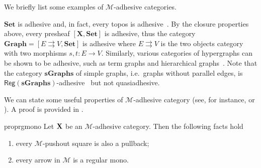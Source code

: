 \documentclass[3p]{elsarticle}
\newcommand{\cat}[1]{\ensuremath{\mathbf{#1}}}
\def\C{\textbf {\textup{C}}}
\def\X{\textbf {\textup{X}}}
\newcommand{\reg}{\mathsf{Reg}}
\theoremstyle{remark}
\theoremstyle{definition}
\begin{document}
We briefly list some examples of $\mathcal{M}$-adhesive categories.

\begin{exa}
	\label{ex:adhesive}
	$\cat{Set}$ is adhesive and, in fact, every topos is
	adhesive~\cite{lack2006toposes}. By the closure properties above, every presheaf $[\cat{X},\cat{Set}]$ is adhesive, thus the category
	$\cat{Graph} = [ E \rightrightarrows V, \cat{Set}]$ is adhesive
	where $E \rightrightarrows {V}$ is the two objects category with two
	morphisms $s,t \colon{E} \to {V}$. Similarly, various
	categories of hypergraphs can be shown to be adhesive, such as term
	graphs and hierarchical graphs~\cite{CastelnovoGM24}. Note that the category $\cat{sGraphs}$ of simple graphs, 
	i.e.~graphs without parallel edges, is
	$\reg{(\cat{sGraphs})}$-adhesive~\cite{BehrHK23} but not
	quasiadhesive.
\end{exa}

\iffalse 
\begin{rem}\label{rem:deco}
We can point out an important property of strict $\mathcal{M}$-adhesive categories with pullbacks.  Consider the solid part of the cube aside, whose bottom case is an $\mathcal{M}$-pushout.
	
	\parbox{9.5cm}{	Given an arrow $d\colon X\to D$, we can present the object $X$ has a pushout: indeed, consider the following cube, in which all the three vertical squares are pullbacks.}
	\parbox{3cm}{
	\xymatrix@C=15pt@R=9pt{&V\ar[dd]|\hole_(.65){a}\ar[rr]^{v} \ar@{>.>}[dl]_{u} && Y \ar[dd]^{b} \ar@{>->}[dl]_{y} \\ Z  \ar[dd]_{c}\ar[rr]^(.7){z} & & X \ar[dd]_(.3){d}\\&A\ar[rr]|\hole^(.65){f} \ar@{>->}[dl]^{m} && B \ar@{>->}[dl]^{n} \\C \ar[rr]_{g} & & D }}

Now, notice that, since the front square is a pullback, then the dotted arrow $u\colon V\to Z$ exists. Moreover, the usual composition and decomposition property of pullbacks \cite{mac2013categories} entails that the left face of the cube so obtained is a pullback too, proving that $u$ is in $\mathcal{M}$ and that the top square is a pushout.

	Clearly if the arrow $p\colon X\to D$ is in $\mathcal{M}$, we can omit the assumptions of strictness and the existence of all pullbacks.
\end{rem}
\fi 


We can state some useful properties of $\mathcal{M}$-adhesive category
(see, for instance, \cite[Thm.~4.26]{ehrig2006fundamentals} or \cite[Fact 2.6]{azzi2019essence}). A proof is provided in .
\begin{restatable}{prop}{rgmono}\label{prop:regmono}
	Let $\X$ be an $\mathcal{M}$-adhesive category. Then the following facts hold
	\begin{enumerate}
		\item every $\mathcal{M}$-pushout square is also a pullback;
		\item every arrow in $\mathcal{M}$ is a regular mono.
	\end{enumerate}
\end{restatable}
\end{document}
